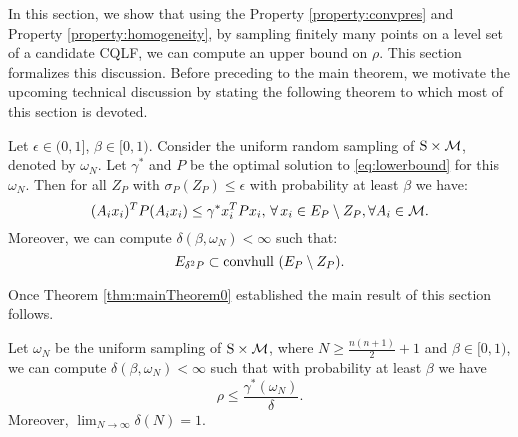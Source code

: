 In this section, we show that using the Property \ref{property:convpres} and Property \ref{property:homogeneity}, by sampling finitely many points on a level set of a candidate CQLF, we can compute an upper bound on $\rho$. This section formalizes this discussion. Before preceding to the main theorem, we motivate the upcoming technical discussion by stating the following theorem to which most of this section is devoted.

\begin{theorem} \label{thm:mainTheorem0} Let $\epsilon \in (0,1]$, $\beta \in [0,1)$. Consider the uniform random sampling of $\text{S} \times \mathcal{M}$, denoted by $\omega_N$. Let $\gamma^*$ and $P$ be the optimal solution to \eqref{eq:lowerbound} for this $\omega_N$. Then for all $Z_P$ with $\sigma_P(Z_P)\leq \epsilon$ with probability at least $\beta$ we have:
\begin{equation} \label{eqn:exceptEps}(A_ix_i)^TP(A_ix_i)\leq \gamma^*x_i^TPx_i,\,\forall\, x_i \in E_P \setminus Z_P, \forall A_i \in \mathcal{M}.\end{equation}
Moreover, we can compute $\delta(\beta, \omega_N) < \infty$ such that:
\begin{equation}\label{eqn:contraction}E_{\delta^2P} \subset  \mbox{convhull } (E_P \setminus Z_P).
\end{equation}
\end{theorem}

Once Theorem \ref{thm:mainTheorem0} established the main result of this section follows.

\begin{theorem} \label{thm:mainTheorem} Let $\omega_N$ be the uniform sampling of $\text{S} \times \mathcal{M}$, where $N \geq \frac{n(n+1)}{2}+1$ and $\beta \in [0,1)$, we can compute $\delta(\beta, \omega_N) < \infty$ such that with probability at least $\beta$ we have $$\rho \leq \frac{\gamma^*(\omega_N)}{\delta}.$$ Moreover, $\lim_{N \to \infty} \delta(N) = 1$.
\end{theorem}

